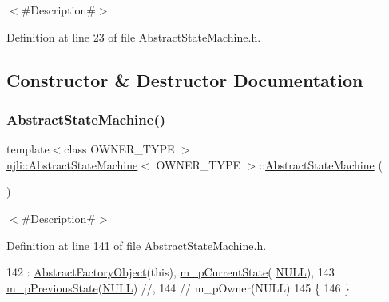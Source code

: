 $<$\#\+Description\#$>$ 

Definition at line 23 of file Abstract\+State\+Machine.\+h.



\subsection{Constructor \& Destructor Documentation}
\mbox{\label{classnjli_1_1_abstract_state_machine_a9656442a1a93737e55b72cdb3f7f6cfd}} 
\subsubsection{\texorpdfstring{Abstract\+State\+Machine()}{AbstractStateMachine()}\hspace{0.1cm}{\footnotesize\ttfamily [1/3]}}
{\footnotesize\ttfamily template$<$class O\+W\+N\+E\+R\+\_\+\+T\+Y\+PE $>$ \\
\mbox{\hyperlink{classnjli_1_1_abstract_state_machine}{njli\+::\+Abstract\+State\+Machine}}$<$ O\+W\+N\+E\+R\+\_\+\+T\+Y\+PE $>$\+::\mbox{\hyperlink{classnjli_1_1_abstract_state_machine}{Abstract\+State\+Machine}} (\begin{DoxyParamCaption}{ }\end{DoxyParamCaption})}

$<$\#\+Description\#$>$ 

Definition at line 141 of file Abstract\+State\+Machine.\+h.


\begin{DoxyCode}
142       : \mbox{\hyperlink{classnjli_1_1_abstract_factory_object_a4f7ae7bf09c7c9426e7d6023f7fd8dec}{AbstractFactoryObject}}(\textcolor{keyword}{this}), \mbox{\hyperlink{classnjli_1_1_abstract_state_machine_ae82332bd955b01fa48471ec0613e8207}{m\_pCurrentState}}(
      \mbox{\hyperlink{_abstract_state_8h_a070d2ce7b6bb7e5c05602aa8c308d0c4}{NULL}}),
143         \mbox{\hyperlink{classnjli_1_1_abstract_state_machine_a43a2c2c7a36aba24176e5d6d82ab9f45}{m\_pPreviousState}}(\mbox{\hyperlink{_abstract_state_8h_a070d2ce7b6bb7e5c05602aa8c308d0c4}{NULL}}) \textcolor{comment}{//,}
144   \textcolor{comment}{//    m\_pOwner(NULL)}
145   \{
146   \}
\end{DoxyCode}
\mbox{\label{classnjli_1_1_abstract_state_machine_a653f5257533125711c79d054265b1fa6}} 
